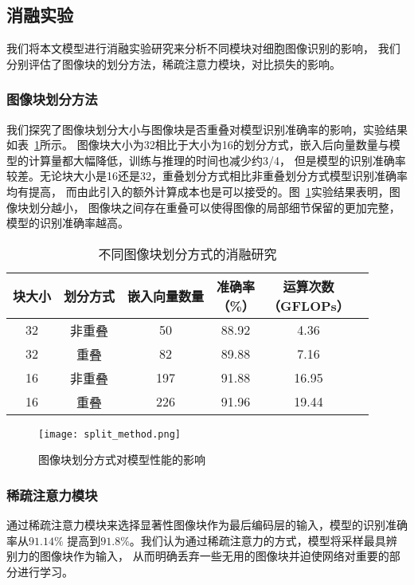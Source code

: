\subsection{消融实验}
我们将本文模型进行消融实验研究来分析不同模块对细胞图像识别的影响，
我们分别评估了图像块的划分方法，稀疏注意力模块，对比损失的影响。

\subsubsection{图像块划分方法}
我们探究了图像块划分大小与图像块是否重叠对模型识别准确率的影响，实验结果如表~\ref{table:split_method}所示。
图像块大小为32相比于大小为16的划分方式，嵌入后向量数量与模型的计算量都大幅降低，训练与推理的时间也减少约3/4，
但是模型的识别准确率较差。无论块大小是16还是32，重叠划分方式相比非重叠划分方式模型识别准确率均有提高，
而由此引入的额外计算成本也是可以接受的。图~\ref{fig:split_method}实验结果表明，图像块划分越小，
图像块之间存在重叠可以使得图像的局部细节保留的更加完整，模型的识别准确率越高。

\begin{table}[htbp]
  \caption{不同图像块划分方式的消融研究}   
  \centering 
  \label{table:split_method}
  \begin{tabular}{cccccc}
    \toprule[2pt]
    块大小 & 划分方式 & 嵌入向量数量 & \makecell{准确率 \\（\%）} & \makecell{运算次数 \\（GFLOPs）}\\
    \midrule[1.5pt] 
        32 & 非重叠 & 50 & 88.92 & 4.36  \\ 
        32 & 重叠 & 82 & 89.88 & 7.16  \\ 
        16 & 非重叠 & 197 & 91.88 & 16.95  \\ 
        16 & 重叠 & 226 & 91.96 & 19.44  \\ 
    \bottomrule[2pt]      
  \end{tabular} 
\end{table}
\begin{figure}[htbp] 
  \centering   
  \texttt{[image: split\_method.png]}   
  \caption{图像块划分方式对模型性能的影响}   
  \label{fig:split_method} 
\end{figure}  

\subsubsection{稀疏注意力模块}
通过稀疏注意力模块来选择显著性图像块作为最后编码层的输入，模型的识别准确率从$91.14\%$ 
提高到$91.8\%$。我们认为通过稀疏注意力的方式，模型将采样最具辨别力的图像块作为输入，
从而明确丢弃一些无用的图像块并迫使网络对重要的部分进行学习。

